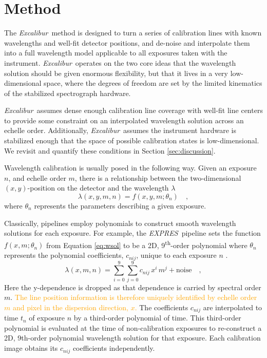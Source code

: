 \documentclass[modern]{aastex63}
\newcommand{\project}[1]{\textsl{#1}}
\newcommand{\name}{\project{Excalibur}}
\newcommand{\acronym}[1]{{\small{#1}}}
\newcommand{\expres}{\project{\acronym{EXPRES}}}
\newcommand{\lz}[1]{\textcolor{orange}{#1}}
\begin{document}
\section{Method} \label{sec:method}
The \name\ method is designed to turn a series of calibration lines with known wavelengths and well-fit detector positions, and de-noise and interpolate them into a full wavelength model applicable to all exposures taken with the instrument.  \name\ operates on the two core ideas that the wavelength solution should be given enormous flexibility, but that it lives in a very low-dimensional space, where the degrees of freedom are set by the limited kinematics of the stabilized spectrograph hardware.

\name\ assumes dense enough calibration line coverage with well-fit line centers to provide some constraint on an interpolated wavelength solution across an echelle order.  Additionally, \name\ assumes the instrument hardware is stabilized enough that the space of possible calibration states is low-dimensional.  We revisit and quantify these conditions in Section \ref{sec:discussion}.

Wavelength calibration is usually posed in the following way.  Given an exposure $n$, and echelle order $m$, there is a relationship between
the two-dimensional $(x,y)$-position on the detector and the
wavelength $\lambda$
\begin{equation}
\lambda(x,y,m,n) = f(x,y,m;\theta_{n})
\quad ,
\label{eq:wsol}
\end{equation}
where $\theta_{n}$ represents the parameters describing a given exposure.

Classically, pipelines employ polynomials to construct smooth wavelength solutions for each exposure.  For example, the \expres\ pipeline sets the function $f(x,m;\theta_{n})$ from Equation \ref{eq:wsol} to be a 2D, 9\textsuperscript{th}-order polynomial where $\theta_{n}$ represents the polynomial coefficients, $c_{nij}$, unique to each exposure $n$ \citep{petersburg2020}.
\begin{equation}
\lambda(x,m,n) = \sum_{i=0}^9\sum_{j=0}^9 c_{nij}\, x^i\,m^j + \mathrm{noise}
\quad ,
\label{eq:poly_wsol}
\end{equation}
Here the y-dependence is dropped as that dependence is carried by spectral order $m$.  \lz{The line position information is therefore uniquely identified by echelle order $m$ and pixel in the dispersion direction, $x$.}  The coefficients $c_{nij}$ are interpolated to time $t_n$ of exposure $n$ by a third-order polynomial of time.  This third-order polynomial is evaluated at the time of non-calibration exposures to re-construct a 2D, 9th-order polynomial wavelength solution for that exposure.  Each calibration image obtains its $c_{nij}$ coefficients independently.
\end{document}
